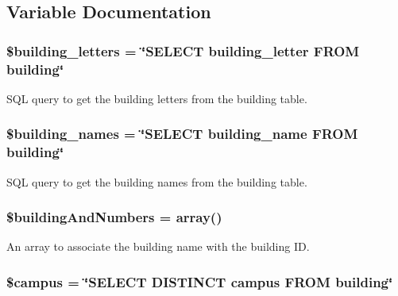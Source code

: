 \subsection{\-Variable \-Documentation}
\hypertarget{manage_8php_ab7c3ef21f41bcddbed5d1f3b591342da}{
\subsubsection[{\$building\-\_\-letters}]{\setlength{\rightskip}{0pt plus 5cm}\$building\-\_\-letters = \char`\"{}\-S\-E\-L\-E\-C\-T building\-\_\-letter \-F\-R\-O\-M building\char`\"{}}}\label{manage_8php_ab7c3ef21f41bcddbed5d1f3b591342da}
\-S\-Q\-L query to get the building letters from the building table. \hypertarget{manage_8php_a8ab55fcf525cc50064165d5b3e77e9a5}{
\subsubsection[{\$building\-\_\-names}]{\setlength{\rightskip}{0pt plus 5cm}\$building\-\_\-names = \char`\"{}\-S\-E\-L\-E\-C\-T building\-\_\-name \-F\-R\-O\-M building\char`\"{}}}\label{manage_8php_a8ab55fcf525cc50064165d5b3e77e9a5}
\-S\-Q\-L query to get the building names from the building table. \hypertarget{manage_8php_ab991259438d75c98bca8f82bd9283a57}{
\subsubsection[{\$building\-And\-Numbers}]{\setlength{\rightskip}{0pt plus 5cm}\$building\-And\-Numbers = array()}}\label{manage_8php_ab991259438d75c98bca8f82bd9283a57}
\-An array to associate the building name with the building \-I\-D. \hypertarget{manage_8php_a6f0655994f3941d6ab50f681032f899b}{
\subsubsection[{\$campus}]{\setlength{\rightskip}{0pt plus 5cm}\$campus = \char`\"{}\-S\-E\-L\-E\-C\-T \-D\-I\-S\-T\-I\-N\-C\-T campus \-F\-R\-O\-M building\char`\"{}}}\label{manage_8php_a6f0655994f3941d6ab50f681032f899b}
